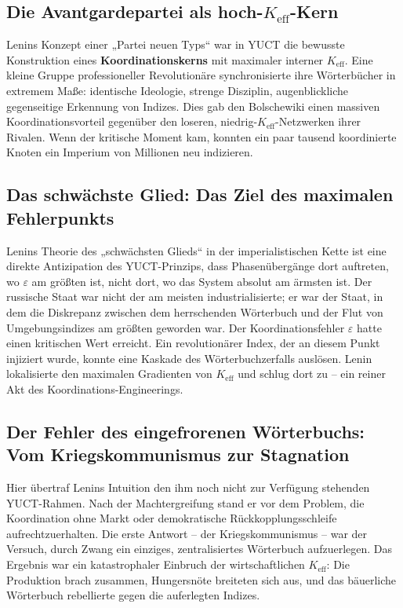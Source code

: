 \documentclass[12pt,a4paper]{article}
\newcommand{\Keff}{K_{\mathrm{eff}}}
\begin{document}
\subsection{Die Avantgardepartei als hoch-\(\Keff\)-Kern}

Lenins Konzept einer „Partei neuen Typs“ war in YUCT die bewusste Konstruktion eines \textbf{Koordinationskerns} mit maximaler interner \(K_{\mathrm{eff}}\). Eine kleine Gruppe professioneller Revolutionäre synchronisierte ihre Wörterbücher in extremem Maße: identische Ideologie, strenge Disziplin, augenblickliche gegenseitige Erkennung von Indizes. Dies gab den Bolschewiki einen massiven Koordinationsvorteil gegenüber den loseren, niedrig-\(\Keff\)-Netzwerken ihrer Rivalen. Wenn der kritische Moment kam, konnten ein paar tausend koordinierte Knoten ein Imperium von Millionen neu indizieren.

\subsection{Das schwächste Glied: Das Ziel des maximalen Fehlerpunkts}

Lenins Theorie des „schwächsten Glieds“ in der imperialistischen Kette ist eine direkte Antizipation des YUCT-Prinzips, dass Phasenübergänge dort auftreten, wo \(\varepsilon\) am größten ist, nicht dort, wo das System absolut am ärmsten ist. Der russische Staat war nicht der am meisten industrialisierte; er war der Staat, in dem die Diskrepanz zwischen dem herrschenden Wörterbuch und der Flut von Umgebungsindizes am größten geworden war. Der Koordinationsfehler \(\varepsilon\) hatte einen kritischen Wert erreicht. Ein revolutionärer Index, der an diesem Punkt injiziert wurde, konnte eine Kaskade des Wörterbuchzerfalls auslösen. Lenin lokalisierte den maximalen Gradienten von \(\Keff\) und schlug dort zu – ein reiner Akt des Koordinations-Engineerings.

\subsection{Der Fehler des eingefrorenen Wörterbuchs: Vom Kriegskommunismus zur Stagnation}

Hier übertraf Lenins Intuition den ihm noch nicht zur Verfügung stehenden YUCT-Rahmen. Nach der Machtergreifung stand er vor dem Problem, die Koordination ohne Markt oder demokratische Rückkopplungsschleife aufrechtzuerhalten. Die erste Antwort – der Kriegskommunismus – war der Versuch, durch Zwang ein einziges, zentralisiertes Wörterbuch aufzuerlegen. Das Ergebnis war ein katastrophaler Einbruch der wirtschaftlichen \(\Keff\): Die Produktion brach zusammen, Hungersnöte breiteten sich aus, und das bäuerliche Wörterbuch rebellierte gegen die auferlegten Indizes.
\end{document}
